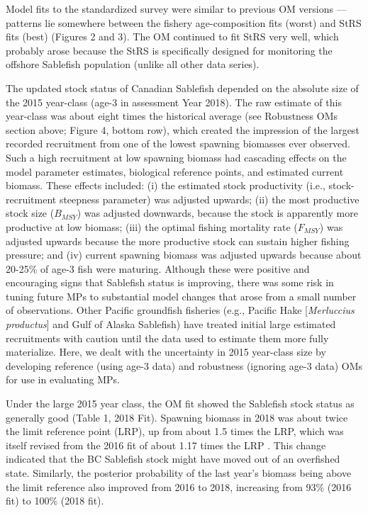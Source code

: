 \documentclass[11pt]{book}
\begin{document}
Model fits to the standardized survey were similar to previous OM versions --- patterns lie somewhere between the fishery age-composition fits (worst) and StRS fits (best) (Figures 2 and 3). The OM continued to fit StRS very well, which probably arose because the StRS is specifically designed for monitoring the offshore Sablefish population (unlike all other data series).

The updated stock status of Canadian Sablefish depended on the absolute size of the 2015 year-class (age-3 in assessment Year 2018). The raw estimate of this year-class was about eight times the historical average (see Robustness OMs section above; Figure 4, bottom row), which created the impression of the largest recorded recruitment from one of the lowest spawning biomasses ever observed. Such a high recruitment at low spawning biomass had cascading effects on the model parameter estimates, biological reference points, and estimated current biomass. These effects included: (i) the estimated stock productivity (i.e., stock-recruitment steepness parameter) was adjusted upwards; (ii) the most productive stock size (\(B_{MSY}\)) was adjusted downwards, because the stock is apparently more productive at low biomass; (iii) the optimal fishing mortality rate (\(F_{MSY}\)) was adjusted upwards because the more productive stock can sustain higher fishing pressure; and (iv) current spawning biomass was adjusted upwards because about 20-25\% of age-3 fish were maturing. Although these were positive and encouraging signs that Sablefish status is improving, there was some risk in tuning future MPs to substantial model changes that arose from a small number of observations. Other Pacific groundfish fisheries (e.g., Pacific Hake {[}\emph{Merluccius productus}{]} and Gulf of Alaska Sablefish) have treated initial large estimated recruitments with caution until the data used to estimate them more fully materialize. Here, we dealt with the uncertainty in 2015 year-class size by developing reference (using age-3 data) and robustness (ignoring age-3 data) OMs for use in evaluating MPs.

Under the large 2015 year class, the OM fit showed the Sablefish stock status as generally good (Table 1, 2018 Fit). Spawning biomass in 2018 was about twice the limit reference point (LRP), up from about 1.5 times the LRP, which was itself revised from the 2016 fit of about 1.17 times the LRP . This change indicated that the BC Sablefish stock might have moved out of an overfished state. Similarly, the posterior probability of the last year's biomass being above the limit reference also improved from 2016 to 2018, increasing from 93\% (2016 fit) to 100\% (2018 fit).
\end{document}
